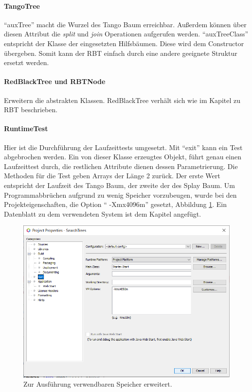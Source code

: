 \documentclass[a4paper,12pt]{article}
\begin{document}
\paragraph{TangoTree}
\enquote{auxTree} macht die Wurzel des Tango Baum erreichbar. Außerdem können über diesen Attribut die \textit{split} und \textit{join} Operationen aufgerufen werden. \enquote{auxTreeClass} entspricht der Klasse der eingesetzten Hilfsbäumen. Diese wird dem Constructor übergeben. Somit kann der RBT einfach durch eine andere geeignete Struktur ersetzt werden.

\paragraph{RedBlackTree und RBTNode}
Erweitern die abstrakten Klassen. RedBlackTree verhält sich wie im Kapitel zu RBT beschrieben.

\paragraph{RuntimeTest}
Hier ist die Durchführung der Laufzeittests umgesetzt. Mit \enquote{exit} kann ein Test abgebrochen werden. Ein von dieser Klasse erzeugtes Objekt, führt genau einen Laufzeittest durch, die restlichen Attribute dienen dessen Parametrierung. Die Methoden für die Test geben Arrays der Länge 2 zurück. Der erste Wert entspricht der Laufzeit des Tango Baum, der zweite der des Splay Baum. Um Programmabbrüchen aufgrund zu wenig Speicher vorzubeugen, wurde bei den Projekteigenschaften, die Option \enquote{ -Xmx4096m} gesetzt, Abbildung \ref{fig:optionSpeicher}. Ein Datenblatt zu dem verwendeten System ist dem Kapitel angefügt.

\begin{figure}[H]
	\centering
	\includegraphics[width=1\textwidth]{"Medien/laufzeittest/optionSpeicher"}
	\caption{Zur Ausführung verwendbaren Speicher erweitert.}
	\label{fig:optionSpeicher}
\end{figure}
\end{document}
